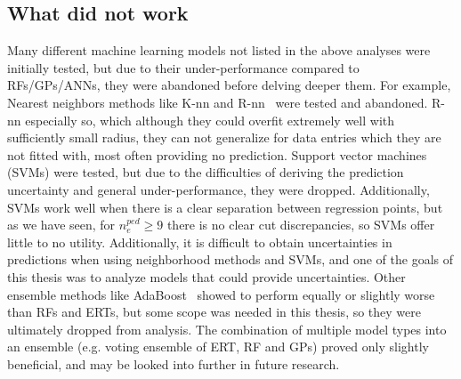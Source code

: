 \documentclass[a4paper, twoside, final, 12pt]{article}
\begin{document}
{
\subsection{What did not work}
Many different machine learning models not listed in the above analyses were initially tested, but due to their under-performance compared to RFs/GPs/ANNs, they were abandoned before delving deeper them. For example, Nearest neighbors methods like K-nn and R-nn~\cite{Mucherino2009} were tested and abandoned. R-nn especially so, which although they could overfit extremely well with sufficiently small radius, they can not generalize for data entries which they are not fitted with, most often providing no prediction. Support vector machines (SVMs) \cite{hastie01statisticallearning} were tested, but due to the difficulties of deriving the prediction uncertainty and general under-performance, they were dropped. Additionally, SVMs work well when there is a clear separation between regression points, but as we have seen, for $n_e^{ped} \geq 9$ there is no clear cut discrepancies, so SVMs offer little to no utility. Additionally, it is difficult to obtain uncertainties in predictions when using neighborhood methods and SVMs, and one of the goals of this thesis was to analyze models that could provide uncertainties. Other ensemble methods like AdaBoost~\cite{schapire2013explaining} showed to perform equally or slightly worse than RFs and ERTs, but some scope was needed in this thesis, so they were ultimately dropped from analysis. The combination of multiple model types into an ensemble (e.g. voting ensemble of ERT, RF and GPs) proved only slightly beneficial, and may be looked into further in future research. 
}
\end{document}
